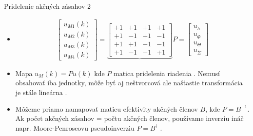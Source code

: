    \begin{frame}{Pridelenie akčných zásahov 2}
  \begin{itemize}
  \item<1->
        \begin{align}
     \begin{bmatrix}
       u_{M1}(k) \\
       u_{M2}(k) \\
       u_{M3}(k) \\
       u_{M4}(k)
     \end{bmatrix}=\underbrace{\begin{bmatrix}
                     +1 & +1 & +1 & +1 \\
                     +1 & -1 & +1 & -1 \\
                     +1 & +1 & -1 & -1 \\
                     +1 & -1 & -1 & +1
                   \end{bmatrix}}P =
                \begin{bmatrix}
                     u_{\dot{h}} \\
       u_{\dot{\Phi}} \\
       u_{\dot{\Theta}} \\
       u_{\dot{\Sigma}}
     \end{bmatrix}
     \end{align}

    \item<2-> Mapa $u_M(k)=Pu(k)$ kde $P$ matica pridelenia riadenia . Nemusí obsahovať iba jednotky, môže byť aj neštvorcová ale našťastie transformácia je stále lineárna \citep{Bresciani2020}.
    \item<3-> Môžeme priamo namapovať maticu efektivity akčných členov  $B$, kde $P=B^{-1}$. Ak počet akčných zásahov = počtu akčných členov, používame inverziu ináč napr. Moore-Penroseovu pseudoinverziu $P=B^{\dagger}$ \citep{Bresciani2020}.
\end{itemize}
  \end{frame}



